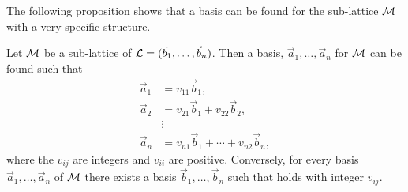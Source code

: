 The following proposition shows that a basis can be found for the
sub-lattice ${\cal M}$ with a very specific structure.

\begin{proposition} \label{SubLattice:Basis:Prop}
Let ${\cal M}$ be a sub-lattice of ${\cal L} = (\vec{b}_1, \ldots,
\vec{b}_n)$.  Then a basis, $\vec{a}_1, \ldots, \vec{a}_n$ for ${\cal
M}$ can be found such that 
\begin{equation} \label{SubLatt:Basis:Eq}
\begin{aligned}
\vec{a}_1 & = v_{11} \vec{b}_1, \\
\vec{a}_2 & = v_{21} \vec{b}_1 + v_{22} \vec{b}_2, \\
  & \vdots \\
\vec{a}_n & = v_{n1} \vec{b}_1 + \cdots + v_{n2} \vec{b}_n,
\end{aligned}
\end{equation}
where the $v_{ij}$ are integers and $v_{ii}$ are positive.
Conversely, for every basis $\vec{a}_1, \ldots, \vec{a}_n$ of ${\cal
M}$ there exists a basis $\vec{b}_1, \ldots, \vec{b}_n$ such that
 holds with integer $v_{ij}$.
\end{proposition}

